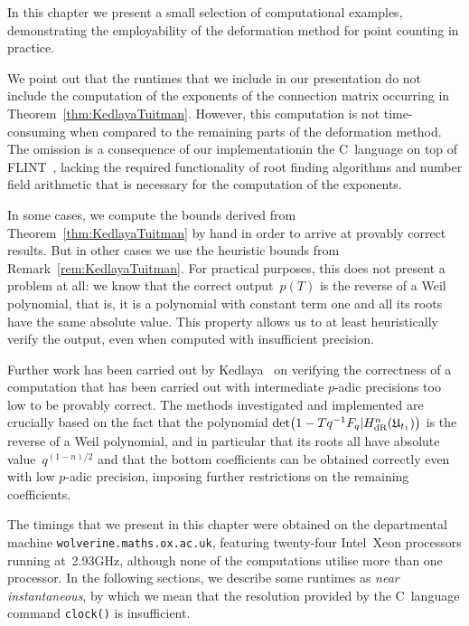 
In this chapter we present a small selection of computational examples, 
demonstrating the employability of the deformation method for point counting 
in practice.

We point out that the runtimes that we include in our presentation 
do not include the computation of the exponents of the connection 
matrix occurring in Theorem~\ref{thm:KedlayaTuitman}.  However, 
this computation is not time-consuming when compared to the remaining 
parts of the deformation method.  The omission is a consequence of 
our implementation\footnotemark in the C~language on top of 
FLINT~\citep{FLINT}, lacking the required functionality of root finding 
algorithms and number field arithmetic that is necessary for the 
computation of the exponents.


In some cases, we compute the bounds derived from 
Theorem~\ref{thm:KedlayaTuitman} by hand in order to arrive at 
provably correct results.  But in other cases we use the heuristic 
bounds from Remark~\ref{rem:KedlayaTuitman}.  For practical purposes, 
this does not present a problem at all:  we know that the correct 
output~$p(T)$ is the reverse of a Weil polynomial, that is, 
it is a polynomial with constant term one and all its roots have 
the same absolute value.  This property allows us to at least 
heuristically verify the output, even when computed with insufficient 
precision.

Further work has been carried out by Kedlaya~\citep{Kedlaya2008} on 
verifying the correctness of a computation that has been carried out 
with intermediate $p$-adic precisions too low to be provably correct. 
The methods investigated and implemented are crucially based on the 
fact that the polynomial 
\mbox{$\det\bigl(1 - T q^{-1} F_q | H_{\text{dR}}^{n}(\mathfrak{U}_{t_1})\bigr)$} 
is the reverse of a Weil polynomial, and in particular that its 
roots all have absolute value~$q^{(1-n)/2}$ and that the bottom 
coefficients can be obtained correctly even with low $p$-adic precision, 
imposing further restrictions on the remaining coefficients.

The timings that we present in this chapter were obtained on the 
departmental machine {\tt{wolverine.maths.ox.ac.uk}}, featuring twenty-four 
\mbox{Intel Xeon} processors running at~2.93GHz, although none of the 
computations utilise more than one processor.  In the following sections, 
we describe some runtimes as \emph{near instantaneous}, by which we mean 
that the resolution provided by the C~language command {\tt{clock()}} is 
insufficient.

